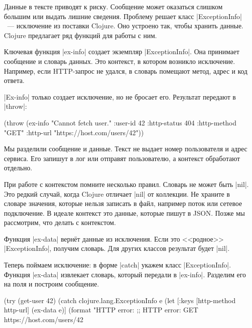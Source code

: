 Данные в тексте приводят к риску. Сообщение может оказаться слишком большим или
выдать лишние сведения. Проблему решает класс \spverb|ExceptionInfo|~---
исключение из поставки Clojure. Оно устроено так, чтобы хранить данные. Clojure
предлагает ряд функций для работы с ним.

Ключевая функция \spverb|ex-info| создает экземпляр \spverb|ExceptionInfo|. Она
принимает сообщение и словарь данных. Это контекст, в котором возникло
исключение. Например, если HTTP-запрос не удался, в словарь помещают метод,
адрес и код ответа.

\spverb|Ex-info| только создает исключение, но не бросает его. Результат
передают в \spverb|throw|:

\begin{english}
  \begin{clojure}
(throw (ex-info
        "Cannot fetch user."
        {:user-id 42
         :http-status 404
         :http-method "GET"
         :http-url "https://host.com/users/42"}))
  \end{clojure}
\end{english}

Мы разделили сообщение и данные. Текст не выдает номер пользователя и адрес
сервиса. Его запишут в лог или отправят пользователю, а контекст обработают
отдельно.

При работе с контекстом помните несколько правил. Словарь не может быть
\spverb|nil|. Это редкий случай, когда Clojure отличает \spverb|nil| от
коллекции. Не храните в словаре значения, которые нельзя записать в файл,
например поток или сетевое подключение. В идеале контекст это данные, которые
пишут в JSON. Позже мы рассмотрим, что делать с контекстом.

Функция \spverb|ex-data| верн\"{е}т данные из исключения. Если это <<родное>>
\spverb|ExceptionInfo|, получим словарь. Для других классов результат будет
\spverb|nil|.

Теперь поймаем исключение: в форме \spverb|catch| укажем класс
\spverb|ExceptionInfo|. Функция \spverb|ex-data| извлекает словарь, который
передали в \spverb|ex-info|. Разделим его на поля и построим сообщение.

\begin{english}
  \begin{clojure}
(try
  (get-user 42)
  (catch clojure.lang.ExceptionInfo e
    (let [{:keys [http-method http-url]} (ex-data e)]
      (format "HTTP error: %
;; HTTP error: GET https://host.com/users/42
  \end{clojure}
\end{english}

